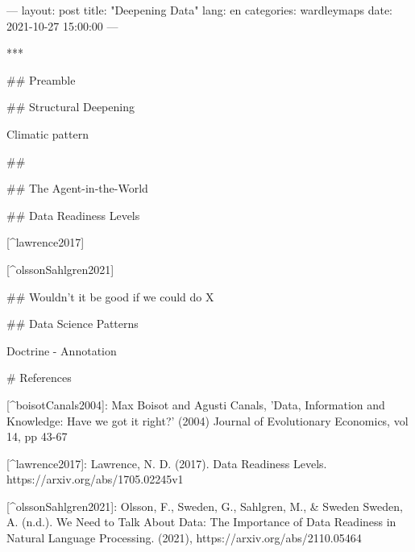 ---
layout: post
title: "Deepening Data"
lang: en
categories: wardleymaps
date: 2021-10-27 15:00:00
---

***

## Preamble


## Structural Deepening

Climatic pattern 


## 


## The Agent-in-the-World

## Data Readiness Levels 

[^lawrence2017]

[^olssonSahlgren2021]

## Wouldn’t it be good if we could do X


## Data Science Patterns 

Doctrine - Annotation 


# References

[^boisotCanals2004]: Max Boisot and Agusti Canals, 'Data, Information and Knowledge: Have we got it right?' (2004) Journal of Evolutionary Economics, vol 14, pp 43-67 

[^lawrence2017]: Lawrence, N. D. (2017). Data Readiness Levels. https://arxiv.org/abs/1705.02245v1

[^olssonSahlgren2021]: Olsson, F., Sweden, G., Sahlgren, M., & Sweden Sweden, A. (n.d.). We Need to Talk About Data: The Importance of Data Readiness in Natural Language Processing. (2021), https://arxiv.org/abs/2110.05464




